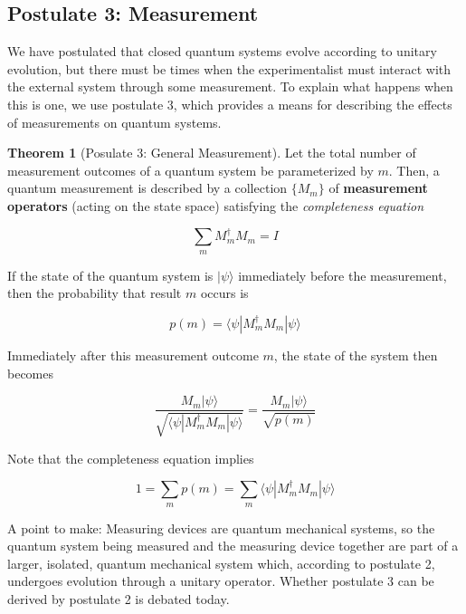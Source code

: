 \documentclass{article}
\theoremstyle{definition}
\newtheorem{theorem}{Theorem}[section]
\begin{document}
  \subsection{Postulate 3: Measurement}

    We have postulated that closed quantum systems evolve according to unitary evolution, but there must be times when the experimentalist must interact with the external system through some measurement. To explain what happens when this is one, we use postulate 3, which provides a means for describing the effects of measurements on quantum systems. 

    \begin{theorem}[Posulate 3: General Measurement]
      Let the total number of measurement outcomes of a quantum system be parameterized by $m$. Then, a quantum measurement is described by a collection $\{M_m\}$ of \textbf{measurement operators} (acting on the state space) satisfying the \textit{completeness equation}

        \[\sum_{m} M_m^\dagger M_m = I\]

      If the state of the quantum system is $|\psi \rangle$ immediately before the measurement, then the probability that result $m$ occurs is

        \[p(m) = \langle \psi | M_m^\dagger M_m | \psi \rangle\]

      Immediately after this measurement outcome $m$, the state of the system then becomes

        \[\frac{M_m |\psi \rangle}{\sqrt{\langle \psi| M_m^\dagger M_m |\psi \rangle}} = \frac{M_m |\psi \rangle}{\sqrt{p(m)}}\]
    \end{theorem}

    Note that the completeness equation implies

      \[1 = \sum_m p(m) = \sum_m \langle \psi | M_m^\dagger M_m | \psi \rangle\]

    A point to make: Measuring devices are quantum mechanical systems, so the quantum system being measured and the measuring device together are part of a larger, isolated, quantum mechanical system which, according to postulate 2, undergoes evolution through a unitary operator. Whether postulate 3 can be derived by postulate 2 is debated today.
\end{document}
